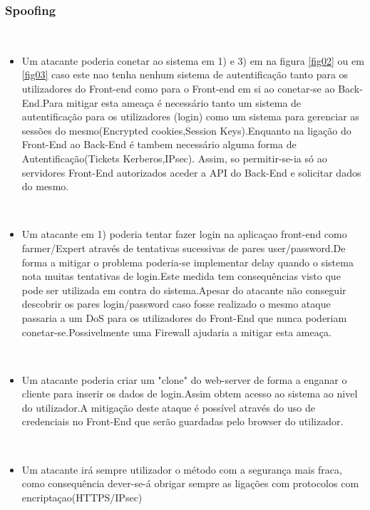 \subsubsection{Spoofing}
\label{Spoofing:sec}
\hfill\\
\begin{itemize}

\item Um atacante poderia conetar ao sistema em 1) e 3) em  na figura \ref{fig02} ou em \ref{fig03} caso este nao tenha nenhum sistema de autentificação tanto para os utilizadores do Front-end como para o Front-end em si ao conetar-se ao Back-End.Para mitigar esta ameaça é necessário tanto um sistema de autentificação para os utilizadores (login) como um sistema para gerenciar as sessões do mesmo(Encrypted cookies,Session Keys).Enquanto na ligação do Front-End ao Back-End é tambem necessário alguma forma de Autentificação(Tickets Kerberos,IPsec). Assim, so permitir-se-ia só ao servidores Front-End autorizados aceder a API do Back-End e solicitar dados do mesmo.

\hfill\\
\item Um atacante em 1) poderia tentar fazer login na aplicaçao front-end como farmer/Expert através de tentativas sucessivas de pares user/password.De forma a mitigar o problema poderia-se implementar delay quando o sistema nota muitas tentativas de login.Este medida tem consequências visto que pode ser utilizada em contra do sistema.Apesar do atacante não conseguir descobrir os pares login/password caso fosse realizado o mesmo ataque passaria a um DoS para os utilizadores do Front-End que nunca poderiam conetar-se.Possivelmente uma Firewall ajudaria a mitigar esta ameaça.

\hfill\\
\item Um atacante poderia criar um "clone" do web-server de forma a enganar o cliente para inserir os dados de login.Assim obtem acesso ao sistema ao nivel do utilizador.A mitigação deste ataque é possível através do uso de credenciais no Front-End que serão guardadas pelo browser do utilizador. 

\hfill\\
\item Um atacante irá sempre utilizador o método com a segurança mais fraca, como consequência dever-se-á obrigar sempre as ligações com protocolos com encriptaçao(HTTPS/IPsec)

\end{itemize}

